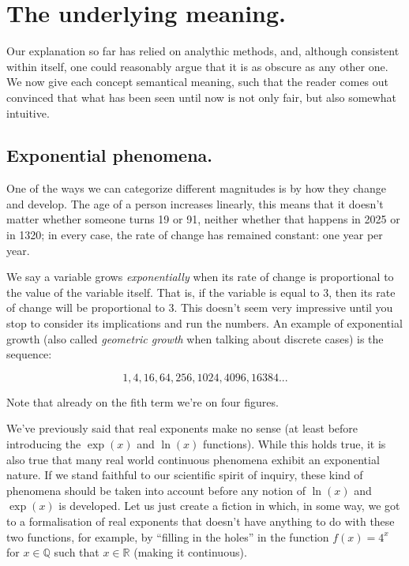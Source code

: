 \section{The underlying meaning.}

Our explanation so far has relied on analythic methods, and, although consistent within itself, one could reasonably argue that it is as obscure as any other one. We now give each concept semantical meaning, such that the reader comes out convinced that what has been seen until now is not only fair, but also somewhat intuitive.

\subsection{Exponential phenomena.}

One of the ways we can categorize different magnitudes is by how they change and develop. The age of a person increases linearly, this means that it doesn't matter whether someone turns 19 or 91, neither whether that happens in 2025 or in 1320; in every case, the rate of change has remained constant: one year per year.

We say a variable grows \textit{exponentially} when its rate of change is proportional to the value of the variable itself. That is, if the variable is equal to 3, then its rate of change will be proportional to 3. This doesn't seem very impressive until you stop to consider its implications and run the numbers. An example of exponential growth (also called \textit{geometric growth} when talking about discrete cases) is the sequence:

$$1, 4, 16, 64, 256, 1024, 4096, 16384...$$

Note that already on the fith term we're on four figures.

We've previously said that real exponents make no sense (at least before introducing the $\exp(x)$ and $\ln(x)$ functions). While this holds true, it is also true that many real world continuous phenomena exhibit an exponential nature. If we stand faithful to our scientific spirit of inquiry, these kind of phenomena should be taken into account before any notion of $\ln(x)$ and $\exp(x)$ is developed. Let us just create a fiction in which, in some way, we got to a formalisation of real exponents that doesn't have anything to do with these two functions, for example, by \enquote{filling in the holes} in the function $f(x) = 4^x$ for $x \in \mathbb{Q}$ such that $x\in \mathbb{R}$ (making it continuous).


